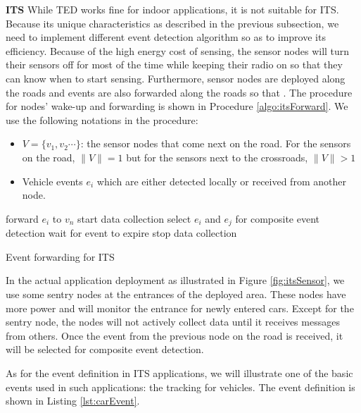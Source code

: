 \textbf{ITS} While TED works fine for indoor applications, it is not suitable for ITS. Because its unique characteristics as described in the previous subsection, we need to implement different event detection algorithm so as to improve its efficiency. Because of the high energy cost of sensing, the sensor nodes will turn their sensors off for most of the time while keeping their radio on so that they can know when to start sensing. Furthermore, sensor nodes are deployed along the roads and events are also forwarded along the roads so that . The procedure for nodes' wake-up and forwarding is shown in Procedure \ref{algo:itsForward}. We use the following notations in the procedure:
\begin{itemize}
\item \(V=\{v_1, v_2 \cdots \}\): the sensor nodes that come next on the road. For the sensors on the road, \(\|V\|=1\) but for the sensors next to the crossroads, \(\|V\|>1\)
\item Vehicle events \(e_i\) which are either detected locally or received from another node.
\end{itemize}

\begin{algorithm}
\begin{algorithmic}
			\STATE forward \(e_i\) to \(v_n\)
		\ENDFOR
	\ENDIF
		\STATE start data collection
			\STATE select \(e_i\) and \(e_j\) for composite event detection
		\ELSE
			\STATE wait for event to expire
		\ENDIF
		\STATE stop data collection
	\ENDIF
\end{algorithmic}
\caption{Event forwarding for ITS}
\label{algo:itsForward}
\end{algorithm}

In the actual application deployment as illustrated in Figure \ref{fig:itsSensor}, we use some sentry nodes at the entrances of the deployed area. These nodes have more power and will monitor the entrance for newly entered cars. Except for the sentry node, the nodes will not actively collect data until it receives messages from others. Once the event from the previous node on the road is received, it will be selected for composite event detection.

As for the event definition in ITS applications, we will illustrate one of the basic events used in such applications: the tracking for vehicles. The event definition is shown in Listing \ref{lst:carEvent}.


